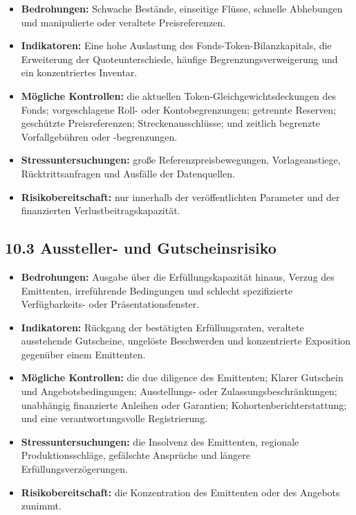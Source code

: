 \documentclass[11pt]{article}
\begin{document}
\begin{itemize}[leftmargin=*]
\item \textbf{Bedrohungen:} Schwache Bestände, einseitige Flüsse, schnelle Abhebungen und manipulierte oder veraltete Preisreferenzen.
\item \textbf{Indikatoren:} Eine hohe Auslastung des Fonds-Token-Bilanzkapitals, die Erweiterung der Quoteunterschiede, häufige Begrenzungsverweigerung und ein konzentriertes Inventar.
\item \textbf{Mögliche Kontrollen:} die aktuellen Token-Gleichgewichtsdeckungen des Fonds; vorgeschlagene Roll- oder Kontobegrenzungen; getrennte Reserven; geschützte Preisreferenzen; Streckenausschlüsse; und zeitlich begrenzte Vorfallgebühren oder -begrenzungen.
\item \textbf{Stressuntersuchungen:} große Referenzpreisbewegungen, Vorlageanstiege, Rücktrittsanfragen und Ausfälle der Datenquellen.
\item \textbf{Risikobereitschaft:} nur innerhalb der veröffentlichten Parameter und der finanzierten Verlustbeitragskapazität.
\end{itemize}
\subsection*{10.3 Aussteller- und Gutscheinsrisiko}

\begin{itemize}[leftmargin=*]
\item \textbf{Bedrohungen:} Ausgabe über die Erfüllungskapazität hinaus, Verzug des Emittenten, irreführende Bedingungen und schlecht spezifizierte Verfügbarkeits- oder Präsentationsfenster.
\item \textbf{Indikatoren:} Rückgang der bestätigten Erfüllungsraten, veraltete ausstehende Gutscheine, ungelöste Beschwerden und konzentrierte Exposition gegenüber einem Emittenten.
\item \textbf{Mögliche Kontrollen:} die due diligence des Emittenten; Klarer Gutschein und Angebotsbedingungen; Ausstellungs- oder Zulassungsbeschränkungen; unabhängig finanzierte Anleihen oder Garantien; Kohortenberichterstattung; und eine verantwortungsvolle Registrierung.
\item \textbf{Stressuntersuchungen:} die Insolvenz des Emittenten, regionale Produktionsschläge, gefälschte Ansprüche und längere Erfüllungsverzögerungen.
\item \textbf{Risikobereitschaft:} die Konzentration des Emittenten oder des Angebots zunimmt.
\end{itemize}
\end{document}
